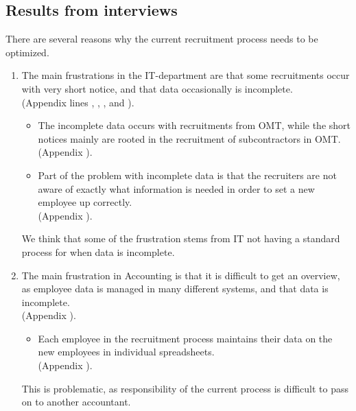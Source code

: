 \subsection{Results from interviews}
There are several reasons why the current recruitment process needs to be optimized.

\begin{enumerate}
\item The main frustrations in the IT-department are that some recruitments occur with very short notice, and that data occasionally is incomplete.\\
(Appendix  lines , , , and ).
\begin{itemize}
\item The incomplete data occurs with recruitments from OMT, while the short notices mainly are rooted in the recruitment of subcontractors in OMT.\\
(Appendix ).
\item Part of the problem with incomplete data is that the recruiters are not aware of exactly what information is needed in order to set a new employee up correctly.\\
(Appendix ).
\end{itemize}

We think that some of the frustration stems from IT not having a standard process for when data is incomplete.

\item The main frustration in Accounting is that it is difficult to get an overview, as employee data is managed in many different systems, and that data is incomplete.\\
(Appendix ).
\begin{itemize}
\item Each employee in the recruitment process maintains their data on the new employees in individual spreadsheets.\\
(Appendix ).
\end{itemize}

This is problematic, as responsibility of the current process is difficult to pass on to another accountant.


\end{enumerate}
